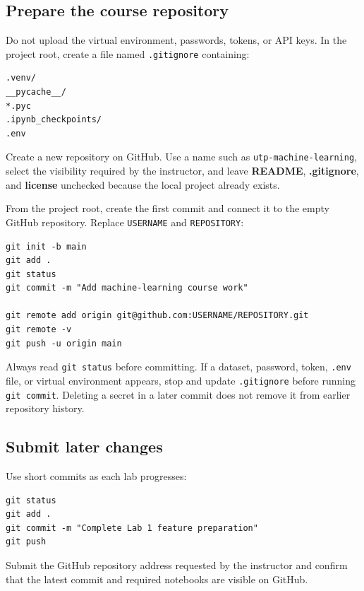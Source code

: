 \subsection{Prepare the course repository}

Do not upload the virtual environment, passwords, tokens, or API keys. In the project root, create a file named \texttt{.gitignore} containing:

\begin{lstlisting}[style=mlterminal]
.venv/
__pycache__/
*.pyc
.ipynb_checkpoints/
.env
\end{lstlisting}

Create a new repository on GitHub. Use a name such as
\texttt{utp-machine-learning}, select the visibility required by the
instructor, and leave \textbf{README}, \textbf{.gitignore}, and
\textbf{license} unchecked because the local project already exists.

From the project root, create the first commit and connect it to the empty
GitHub repository. Replace \texttt{USERNAME} and \texttt{REPOSITORY}:

\begin{lstlisting}[style=mlterminal]
git init -b main
git add .
git status
git commit -m "Add machine-learning course work"

git remote add origin git@github.com:USERNAME/REPOSITORY.git
git remote -v
git push -u origin main
\end{lstlisting}

\begin{pitfall}
Always read \texttt{git status} before committing. If a dataset, password,
token, \texttt{.env} file, or virtual environment appears, stop and update
\texttt{.gitignore} before running \texttt{git commit}. Deleting a secret in a
later commit does not remove it from earlier repository history.
\end{pitfall}

\subsection{Submit later changes}

Use short commits as each lab progresses:

\begin{lstlisting}[style=mlterminal]
git status
git add .
git commit -m "Complete Lab 1 feature preparation"
git push
\end{lstlisting}

Submit the GitHub repository address requested by the instructor and confirm that the latest commit and required notebooks are visible on GitHub.
